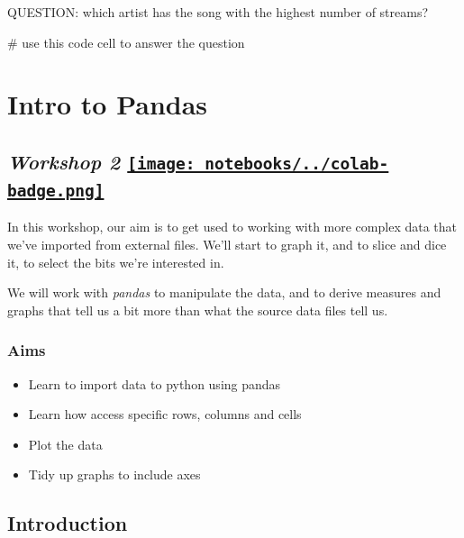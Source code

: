 \documentclass[
  letterpaper,
  DIV=11,
  numbers=noendperiod]{scrreprt}
\newenvironment{Shaded}{\begin{snugshade}}{\end{snugshade}}
\newcommand{\CommentTok}[1]{\textcolor[rgb]{0.37,0.37,0.37}{#1}}
\providecommand{\tightlist}{%
  \setlength{\itemsep}{0pt}\setlength{\parskip}{0pt}}\usepackage{longtable,booktabs,array}
\begin{document}
QUESTION: which artist has the song with the highest number of streams?

\begin{Shaded}
\begin{Highlighting}[]
\CommentTok{\# use this code cell to answer the question}
\end{Highlighting}
\end{Shaded}


\hypertarget{intro-to-pandas}{%
\chapter{Intro to Pandas}\label{intro-to-pandas}}

\hypertarget{workshop-2-open-in-colab}{%
\section[\emph{Workshop 2} ]{\texorpdfstring{\emph{Workshop 2}
\href{https://colab.research.google.com/github/oballinger/QM2/blob/main/notebooks/W02.\%20Pandas.ipynb}{\protect\texttt{[image: notebooks/../colab-badge.png]}}}{Workshop 2 Open In Colab}}\label{workshop-2-open-in-colab}}

In this workshop, our aim is to get used to working with more complex
data that we've imported from external files. We'll start to graph it,
and to slice and dice it, to select the bits we're interested in.

We will work with \emph{pandas} to manipulate the data, and to derive
measures and graphs that tell us a bit more than what the source data
files tell us.

\hypertarget{aims}{%
\subsection{Aims}\label{aims}}

\begin{itemize}
\tightlist
\item
  Learn to import data to python using pandas
\item
  Learn how access specific rows, columns and cells
\item
  Plot the data
\item
  Tidy up graphs to include axes
\end{itemize}

\hypertarget{introduction}{%
\section{Introduction}\label{introduction}}
\end{document}
